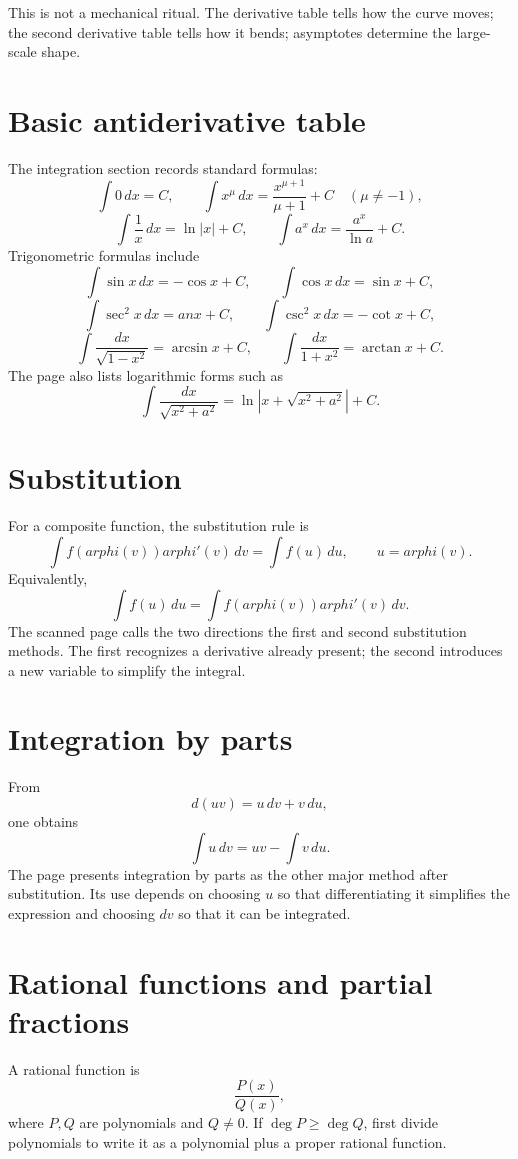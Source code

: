 This is not a mechanical ritual.  The derivative table tells how the curve moves; the second derivative table tells how it bends; asymptotes determine the large-scale shape.

\section{Basic antiderivative table}

The integration section records standard formulas:
\[
  \int 0\,dx=C,\qquad
  \int x^\mu\,dx=
\frac{x^{\mu+1}}{\mu+1}+C\quad(\mu\ne-1),
\]
\[
  \int
\frac1x\,dx=\ln|x|+C,
  \qquad
  \int a^x\,dx=
\frac{a^x}{\ln a}+C.
\]
Trigonometric formulas include
\[
  \int\sin x\,dx=-\cos x+C,\qquad
  \int\cos x\,dx=\sin x+C,
\]
\[
  \int\sec^2x\,dx=	an x+C,\qquad
  \int\csc^2x\,dx=-\cot x+C,
\]
\[
  \int
\frac{dx}{\sqrt{1-x^2}}=\arcsin x+C,
  \qquad
  \int
\frac{dx}{1+x^2}=\arctan x+C.
\]
The page also lists logarithmic forms such as
\[
  \int
\frac{dx}{\sqrt{x^2+a^2}}
  =\ln|x+\sqrt{x^2+a^2}|+C.
\]

\section{Substitution}

For a composite function, the substitution rule is
\[
  \int f(
arphi(v))
arphi'(v)\,dv
  =
  \int f(u)\,du,
  \qquad u=
arphi(v).
\]
Equivalently,
\[
  \int f(u)\,du
  =
  \int f(
arphi(v))
arphi'(v)\,dv.
\]
The scanned page calls the two directions the first and second substitution methods.  The first recognizes a derivative already present; the second introduces a new variable to simplify the integral.

\section{Integration by parts}

From
\[
  d(uv)=u\,dv+v\,du,
\]
one obtains
\[
  \int u\,dv=uv-\int v\,du.
\]
The page presents integration by parts as the other major method after substitution.  Its use depends on choosing $u$ so that differentiating it simplifies the expression and choosing $dv$ so that it can be integrated.

\section{Rational functions and partial fractions}

A rational function is
\[
\frac{P(x)}{Q(x)},
\]
where $P,Q$ are polynomials and $Q\ne0$.  If $\deg P\ge \deg Q$, first divide polynomials to write it as a polynomial plus a proper rational function.

